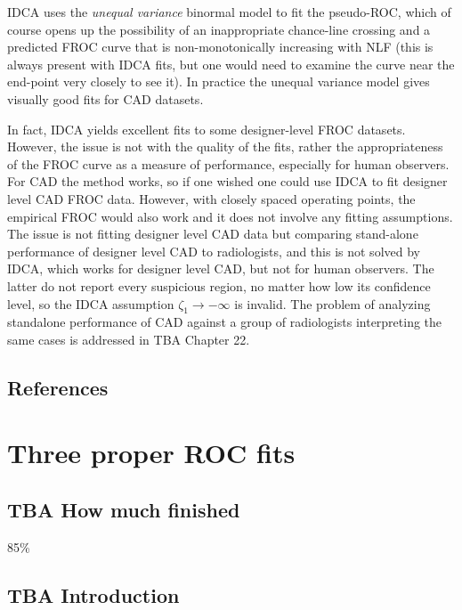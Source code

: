 \documentclass[
]{book}
\begin{document}
IDCA uses the \emph{unequal variance} binormal model to fit the pseudo-ROC, which of course opens up the possibility of an inappropriate chance-line crossing and a predicted FROC curve that is non-monotonically increasing with NLF (this is always present with IDCA fits, but one would need to examine the curve near the end-point very closely to see it). In practice the unequal variance model gives visually good fits for CAD datasets.

In fact, IDCA yields excellent fits to some designer-level FROC datasets. However, the issue is not with the quality of the fits, rather the appropriateness of the FROC curve as a measure of performance, especially for human observers. For CAD the method works, so if one wished one could use IDCA to fit designer level CAD FROC data. However, with closely spaced operating points, the empirical FROC would also work and it does not involve any fitting assumptions. The issue is not fitting designer level CAD data but comparing stand-alone performance of designer level CAD to radiologists, and this is not solved by IDCA, which works for designer level CAD, but not for human observers. The latter do not report every suspicious region, no matter how low its confidence level, so the IDCA assumption \(\zeta_1 \rightarrow -\infty\) is invalid. The problem of analyzing standalone performance of CAD against a group of radiologists interpreting the same cases is addressed in TBA Chapter 22.

\hypertarget{rsm-fitting-references}{%
\section{References}\label{rsm-fitting-references}}

\hypertarget{rsm-3-fits}{%
\chapter{Three proper ROC fits}\label{rsm-3-fits}}

\hypertarget{rsm-3-fits-how-much-finished}{%
\section{TBA How much finished}\label{rsm-3-fits-how-much-finished}}

85\%

\hypertarget{rsm-3-fits-intro}{%
\section{TBA Introduction}\label{rsm-3-fits-intro}}
\end{document}

